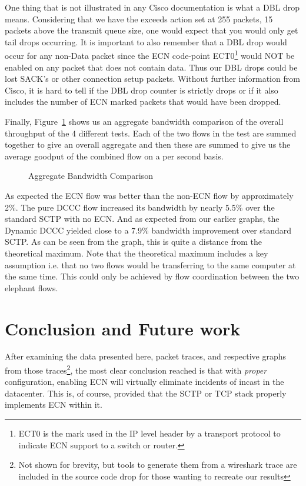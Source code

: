 \documentclass[12pt]{article}
\begin{document}
One thing that is not illustrated in any Cisco documentation is what a DBL drop means. Considering
that we have the exceeds action set at 255 packets, 15 packets above the transmit queue size, one
would expect that you would only get tail drops occurring.  It is important to also remember that a DBL 
drop would occur for any non-Data packet since the ECN code-point ECT0\footnote{ECT0 is the
mark used in the IP level header by a transport protocol to indicate ECN support to a switch
or router.} would NOT be enabled on any packet that
does not contain data. Thus our DBL drops could be lost SACK's or other connection setup packets.
Without further information from Cisco, it is hard to tell if the DBL drop counter is strictly drops or
if it also includes the number of ECN marked packets that would have been dropped.


Finally, Figure~\ref{fig:aggBw}  shows us an aggregate bandwidth comparison of the 
overall throughput of the 4 different tests. Each of the two flows in the test are summed
together to give an overall aggregate and then these are summed to give us the average
goodput of the combined flow on a per second basis. 

\begin{figure}[h]
\centering
{}
\caption{Aggregate Bandwidth Comparison}
\label{fig:aggBw}
\end{figure}

As expected the ECN flow was better than the non-ECN flow by approximately 2\%. The
pure DCCC flow increased its bandwidth by nearly 5.5\% over the standard SCTP with no ECN.
And as expected from our earlier graphs, the Dynamic DCCC yielded close to a 7.9\% bandwidth
improvement over standard SCTP. As can be seen from the graph, this is quite a distance from the
theoretical maximum. Note that the theoretical maximum includes a key assumption i.e. that 
no two flows would be transferring to the same computer at the same time. This could only
be achieved by flow coordination between the two elephant flows.

\section{Conclusion and Future work}

After examining the data presented here, packet traces, and respective
graphs from those traces\footnote{Not shown for brevity, but tools to generate them from a wireshark trace are included in the source
code drop for those wanting to recreate our results}, the most clear conclusion reached is that 
with \emph{proper} configuration, enabling ECN will virtually eliminate incidents of
incast in the datacenter. This is, of course, provided that the SCTP or
TCP stack properly implements ECN within it. 
\\
\end{document}
